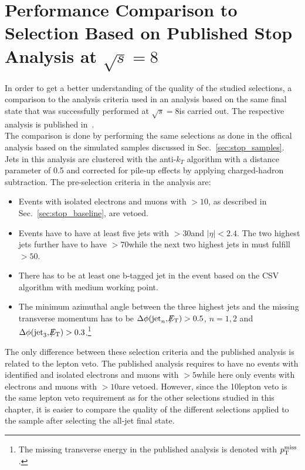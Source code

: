 \section[Performance Comparison to Selection Based on Published Stop Analysis]{Performance Comparison to Selection Based on Published Stop Analysis at $\sqrt{s} = 8$\tev}
\label{sec:stop_pub}
In order to get a better understanding of the quality of the studied selections, a comparison to the analysis criteria used in an analysis based on the same final state that was successfully performed at $\sqrt{s} = 8$\tev is carried out. The respective analysis is published in~\cite{CMS-PAS-SUS-13-015}. \\
The comparison is done by performing the same selections as done in the offical analysis based on the simulated samples discussed in Sec.~\ref{sec:stop_samples}. Jets in this analysis are clustered with the anti-$k_T$ algorithm with a distance parameter of 0.5 and corrected for pile-up effects by applying charged-hadron subtraction. The pre-selection criteria in the analysis are:
\begin{itemize}
 \item Events with isolated electrons and muons with \pt$ > 10$\gev, as described in Sec.~\ref{sec:stop_baseline}, are vetoed.
 \item Events have to have at least five jets with \pt$ > 30$\gev and $|\eta| < 2.4$. The two highest \pt jets further have to have \pt$> 70$\gev while the next two highest jets in \pt must fulfill \pt$ > 50$\gev.
 \item There has to be at least one b-tagged jet in the event based on the CSV algorithm with medium working point. 
 \item The minimum azimuthal angle between the three highest jets and the missing transverse momentum has to be $\Delta \phi(\mathrm{jet}_n, \slash\mkern-12mu{E}_{\text{T}}) > 0.5$, $n = 1,2$ and $\Delta \phi(\mathrm{jet}_3, \slash\mkern-12mu{E}_{\text{T}}) > 0.3$.\footnote{The missing transverse energy in the published analysis is denoted with $p_{\text{T}}^\mathrm{miss}$.}%
\end{itemize}
The only difference between these selection criteria and the published analysis is related to the lepton veto. The published analysis requires to have no events with identified and isolated electrons and muons with \pt$> 5$\gev while here only events with electrons and muons with \pt$> 10$\gev are vetoed. However, since the 10\gev lepton veto is the same lepton veto requirement as for the other selections studied in this chapter, it is easier to compare the quality of the different selections applied to the sample after selecting the all-jet final state. \\
